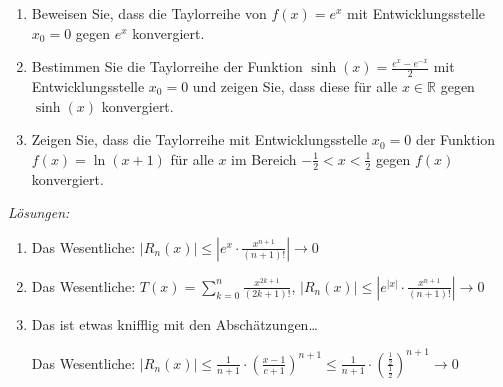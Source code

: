 

\clearpage

\begin{ueb}
    {}{}
    \begin{enumerate}
        \item	Beweisen Sie, dass die Taylorreihe von $f(x)=e^x$ mit Entwicklungsstelle $x_0=0$ gegen $e^x$ konvergiert.
        
        \item Bestimmen Sie die Taylorreihe der Funktion \(\sinh(x) = \frac{e^x - e^{-x}}{2}\) mit Entwicklungsstelle \(x_0 = 0\) und zeigen Sie, dass diese für alle \(x \in \mathbb{R}\) gegen \(\sinh(x)\) konvergiert.

        \item Zeigen Sie, dass die Taylorreihe mit Entwicklungsstelle \(x_0 = 0\) der Funktion \(f(x) = \ln(x+1)\) für alle \(x\) im Bereich \(-\frac{1}{2} < x < \frac{1}{2}\) gegen \(f(x)\) konvergiert.

    \end{enumerate}
\end{ueb}
\clearpage
\emph{Lösungen:}
\begin{enumerate}
   
    \item Das Wesentliche: \( |R_n(x)| \leq |e^x \cdot \frac{x^{n+1}}{(n+1)!}| \rightarrow 0 \)
        
    
        
        \item Das Wesentliche: \( T(x) = \sum_{k=0}^n \frac{x^{2k+1}}{(2k+1)!} \), \( |R_n(x)| \leq |e^{|x|} \cdot \frac{x^{n+1}}{(n+1)!}| \rightarrow 0 \)
        
       \item Das ist etwas knifflig mit den Abschätzungen\dots
       
       Das Wesentliche: \( |R_n(x)| \leq \frac{1}{n+1} \cdot \left(\frac{x-1}{c+1}\right)^{n+1} \leq \frac{1}{n+1} \cdot \left(\frac{\frac{1}{2}}{\frac{1}{2}}\right)^{n+1} \rightarrow 0\)    
\end{enumerate}